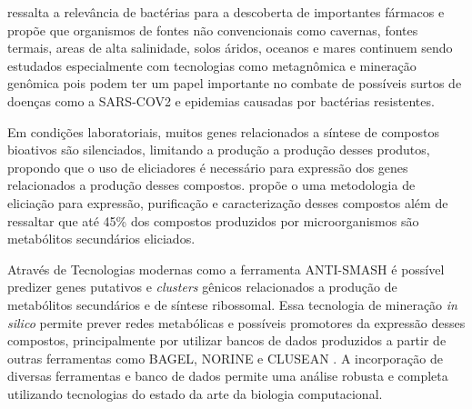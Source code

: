  ressalta a relevância de bactérias para a descoberta de importantes
fármacos e propõe que organismos de fontes não convencionais como cavernas, fontes termais,
areas de alta salinidade, solos áridos, oceanos e mares continuem sendo estudados especialmente
com tecnologias como metagnômica e mineração genômica pois podem ter um papel importante no 
combate de possíveis surtos de doenças como a SARS-COV2 e epidemias causadas por bactérias resistentes.


Em condições laboratoriais, muitos genes relacionados a síntese de
compostos bioativos são silenciados, limitando a produção a produção desses produtos, propondo
que o uso de eliciadores é necessário para expressão dos genes relacionados a produção desses 
compostos\cite{rutledge2015}.  propõe o uma metodologia de eliciação para expressão, purificação
e caracterização desses compostos além de ressaltar que até 45\% dos compostos produzidos por
microorganismos são metabólitos secundários eliciados.

Através de Tecnologias modernas como a ferramenta ANTI-SMASH \cite{antismash} é possível predizer
genes putativos e \textit{clusters} gênicos relacionados a produção de metabólitos secundários
e de síntese ribossomal. Essa tecnologia de mineração \textit{in silico} permite prever redes
metabólicas e possíveis promotores da expressão desses compostos, principalmente por utilizar
bancos de dados produzidos a partir de outras ferramentas como BAGEL, NORINE e CLUSEAN \cite{bagel2,bagel3,norine,clusean}.
A incorporação de diversas ferramentas e banco de dados permite uma análise robusta 
e completa utilizando tecnologias do estado da arte da biologia computacional.
